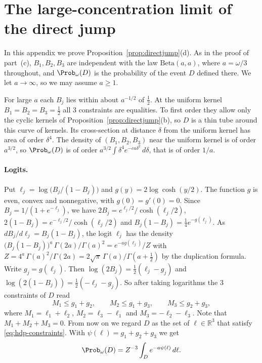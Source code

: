 \section{The large-concentration limit of the direct jump}\label{app:hdp}

In this appendix we prove Proposition~\ref{prop:directjump}(d). As in the
proof of part~(c), $B_1,B_2,B_3$ are independent with the law
$\mathrm{Beta}(a,a)$, where $a=\omega/3$ throughout, and $\Prob_\omega(D)$ is the
probability of the event $D$ defined there. We let $a\to\infty$, so we may
assume $a\ge1$.

For large $a$ each $B_j$ lies within about $a^{-1/2}$ of $\frac12$. At the
uniform kernel $B_1=B_2=B_3=\frac12$ all 3 constraints are equalities. To
first order they allow only the cyclic kernels of
Proposition~\ref{prop:directjump}(b), so $D$ is a thin tube around this
curve of kernels. Its cross-section at distance $\delta$ from the uniform
kernel has area of order $\delta^4$. The density of $(B_1,B_2,B_3)$ near the
uniform kernel is of order $a^{3/2}$, so $\Prob_\omega(D)$ is of order
$a^{3/2}\int\delta^4e^{-ca\delta^2}\,d\delta$, that is of order $1/a$.

\paragraph{Logits.}
Put $\ell_j=\log\bigl(B_j/(1-B_j)\bigr)$ and $g(y)=2\log\cosh(y/2)$. The
function $g$ is even, convex and nonnegative, with $g(0)=g'(0)=0$. Since
$B_j=1/(1+e^{-\ell_j})$, we have
$2B_j=e^{\ell_j/2}/\cosh(\ell_j/2)$,
$2(1-B_j)=e^{-\ell_j/2}/\cosh(\ell_j/2)$ and
$B_j(1-B_j)=\frac14e^{-g(\ell_j)}$. As $dB_j/d\ell_j=B_j(1-B_j)$, the logit
$\ell_j$ has the density
$\bigl(B_j(1-B_j)\bigr)^a\,\Gamma(2a)/\Gamma(a)^2=e^{-ag(\ell_j)}/Z$ with
$Z=4^a\,\Gamma(a)^2/\Gamma(2a)=2\sqrt\pi\,\Gamma(a)/\Gamma(a+\frac12)$ by the
duplication formula. Write $g_j=g(\ell_j)$. Then
$\log(2B_j)=\frac12(\ell_j-g_j)$ and $\log(2(1-B_j))=\frac12(-\ell_j-g_j)$.
So after taking logarithms the 3 constraints of $D$ read
\begin{equation}\label{eq:hdp-constraints}
 M_1\le g_1+g_2,\qquad M_2\le g_1+g_3,\qquad M_3\le g_2+g_3,
\end{equation}
where $M_1=\ell_1+\ell_2$, $M_2=\ell_3-\ell_1$ and $M_3=-\ell_2-\ell_3$. Note
that $M_1+M_2+M_3=0$. From now on we regard $D$ as the set of
$\ell\in\mathbb R^3$ that satisfy \eqref{eq:hdp-constraints}. With
$\psi(\ell)=g_1+g_2+g_3$ we get
\begin{equation}\label{eq:hdp-integral}
 \Prob_\omega(D)=Z^{-3}\int_D e^{-a\psi(\ell)}\,d\ell .
\end{equation}

